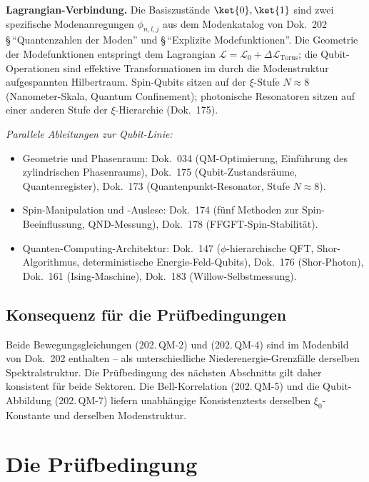 \textbf{Lagrangian-Verbindung.} Die Basiszustände $\ket{0}, \ket{1}$
sind zwei spezifische Modenanregungen $\phi_{n,l,j}$ aus dem
Modenkatalog von Dok.~202 \S\,\enquote{Quantenzahlen der Moden}
und \S\,\enquote{Explizite Modefunktionen}. Die Geometrie der
Modefunktionen entspringt dem Lagrangian
$\mathcal{L} = \mathcal{L}_0 + \Delta\mathcal{L}_{\text{Torus}}$;
die Qubit-Operationen sind effektive Transformationen im durch die
Modenstruktur aufgespannten Hilbertraum. Spin-Qubits sitzen auf der
$\xi$-Stufe $N \approx 8$ (Nanometer-Skala, Quantum Confinement);
photonische Resonatoren sitzen auf einer anderen Stufe der
$\xi$-Hierarchie (Dok.~175).

\textit{Parallele Ableitungen zur Qubit-Linie:}
\begin{itemize}\setlength\itemsep{0pt}
  \item Geometrie und Phasenraum:
        Dok.~034 (QM-Optimierung, Einführung des zylindrischen
        Phasenraums),
        Dok.~175 (Qubit-Zustandsräume, Quantenregister),
        Dok.~173 (Quantenpunkt-Resonator, Stufe $N \approx 8$).
  \item Spin-Manipulation und -Auslese:
        Dok.~174 (fünf Methoden zur Spin-Beeinflussung,
        QND-Messung),
        Dok.~178 (FFGFT-Spin-Stabilität).
  \item Quanten-Computing-Architektur:
        Dok.~147 ($\phi$-hierarchische QFT, Shor-Algorithmus,
        deterministische Energie-Feld-Qubits),
        Dok.~176 (Shor-Photon),
        Dok.~161 (Ising-Maschine),
        Dok.~183 (Willow-Selbstmessung).
\end{itemize}

\subsection*{Konsequenz für die Prüfbedingungen}

Beide Bewegungsgleichungen (202.\,QM-2) und (202.\,QM-4) sind im
Modenbild von Dok.~202 enthalten -- als unterschiedliche
Niederenergie-Grenzfälle derselben Spektralstruktur. Die
Prüfbedingung des nächsten Abschnitts gilt daher konsistent für beide
Sektoren. Die Bell-Korrelation (202.\,QM-5) und die Qubit-Abbildung
(202.\,QM-7) liefern unabhängige Konsistenztests derselben
$\xi_0$-Konstante und derselben Modenstruktur.

\section{Die Prüfbedingung}

